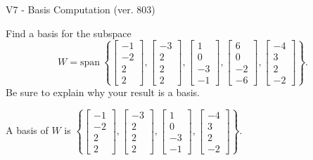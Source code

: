 \begin{exercise}
  \begin{exerciseTitle}V7 - Basis Computation (ver. 803)\end{exerciseTitle}
  \begin{exerciseStatement}
    Find a basis for the subspace 
\[W=\mathrm{span}\ \left\{\left[\begin{array}{r}
-1 \\
-2 \\
2 \\
2
\end{array}\right] , \left[\begin{array}{r}
-3 \\
2 \\
2 \\
2
\end{array}\right] , \left[\begin{array}{r}
1 \\
0 \\
-3 \\
-1
\end{array}\right] , \left[\begin{array}{r}
6 \\
0 \\
-2 \\
-6
\end{array}\right] , \left[\begin{array}{r}
-4 \\
3 \\
2 \\
-2
\end{array}\right]\right\}.\]
 Be sure to explain why your result is a basis.


  \end{exerciseStatement}
  \begin{exerciseAnswer}
   A basis of \(W\) is  \(\left\{\left[\begin{array}{r}
-1 \\
-2 \\
2 \\
2
\end{array}\right] , \left[\begin{array}{r}
-3 \\
2 \\
2 \\
2
\end{array}\right] , \left[\begin{array}{r}
1 \\
0 \\
-3 \\
-1
\end{array}\right] , \left[\begin{array}{r}
-4 \\
3 \\
2 \\
-2
\end{array}\right]\right\}\).
  


  \end{exerciseAnswer}
\end{exercise}